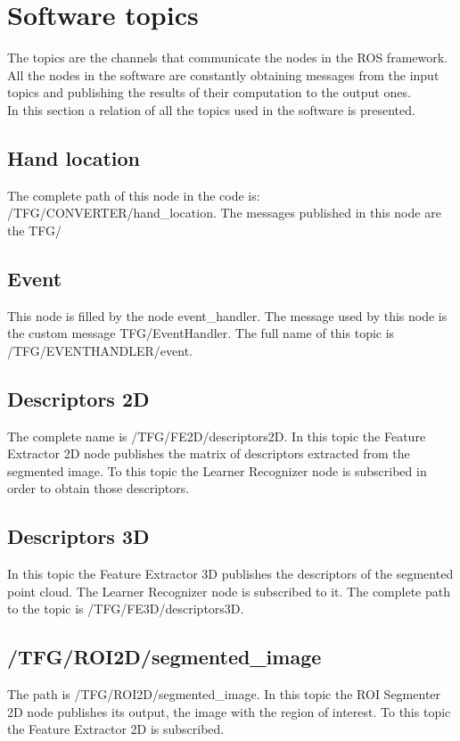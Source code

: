 \section{Software topics}
\label{software_topics}

The topics are the channels that communicate the nodes in the ROS framework. All the nodes in the software are constantly obtaining messages from the input topics and publishing the results of their computation to the output ones. 
\\

In this section a relation of all the topics used in the software is presented. 


\subsection{Hand location}
The complete path of this node in the code is: /TFG/CONVERTER/hand\_location. The messages published in this node are the TFG/
\subsection{Event}
This node is filled by the node event\_handler. The message used by this node is the custom message TFG/EventHandler. The full name of this topic is /TFG/EVENTHANDLER/event. 

\subsection{Descriptors 2D}
The complete name is /TFG/FE2D/descriptors2D. In this topic the Feature Extractor 2D node publishes the matrix of descriptors extracted from the segmented image. To this topic the Learner Recognizer node is subscribed in order to obtain those descriptors.  

\subsection{Descriptors 3D}
In this topic the Feature Extractor 3D publishes the descriptors of the segmented point cloud. The Learner Recognizer node is subscribed to it. 
The complete path to the topic is /TFG/FE3D/descriptors3D.


\subsection{/TFG/ROI2D/segmented\_image}
The path  is /TFG/ROI2D/segmented\_image. In this topic the  ROI Segmenter 2D node publishes its output, the image with the region of interest. To this topic the Feature Extractor 2D is subscribed. 



